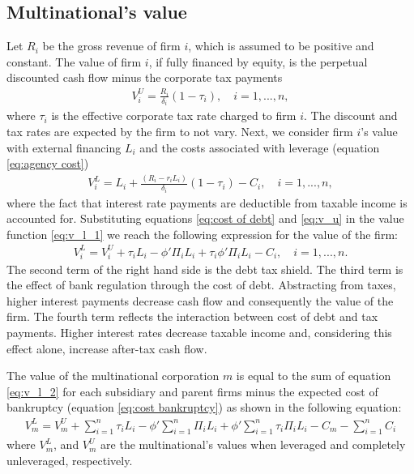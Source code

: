 \documentclass[12pt]{article}
\begin{document}
	\subsection{Multinational's value}
	\label{subsec:value}
	Let $R_i$ be the gross revenue of firm $i$, which is assumed to be positive and constant. The value of firm $i$, if fully financed by equity, is the perpetual discounted cash flow minus the corporate tax payments 
	\begin{equation}
	\begin{aligned}
	V_i^U=\frac{R_i}{\delta_i}(1-\tau_{i}), \quad i=1,...,n,
	\end{aligned}
	\label{eq:v_u}
	\end{equation}	
	where $\tau_{i}$ is the effective corporate tax rate charged to firm $i$. The discount and tax rates are expected by the firm to not vary. Next, we consider firm $i$'s value with external financing $L_i$ and the costs associated with leverage (equation \ref{eq:agency cost})
	\begin{equation}
	\begin{aligned}
	V_i^L=L_i+\frac{(R_i-r_iL_i)}{\delta_i}(1-\tau_{i})-C_i, \quad i=1,...,n,
	\end{aligned}
	\label{eq:v_l_1}
	\end{equation}	
	where the fact that interest rate payments are deductible from taxable income is accounted for. Substituting equations \ref{eq:cost of debt} and \ref{eq:v_u} in the value function \ref{eq:v_l_1} we reach the following expression for the value of the firm:
	\begin{equation}
	\begin{aligned}
	V_i^L=V_i^U+\tau_{i}L_i-\phi'\Pi_iL_i+\tau_{i}\phi'\Pi_iL_i-C_i, \quad i=1,...,n.
	\end{aligned}
	\label{eq:v_l_2}
	\end{equation}	
	The second term of the right hand side is the debt tax shield. The third term is the effect of bank regulation through the cost of debt. Abstracting from taxes, higher interest payments decrease cash flow and consequently the value of the firm. The fourth term reflects the interaction between cost of debt and tax payments. Higher interest rates decrease taxable income and, considering this effect alone, increase after-tax cash flow.
	
	The value of the multinational corporation $m$ is equal to the sum of equation \ref{eq:v_l_2} for each subsidiary and parent firms minus the expected cost of bankruptcy (equation \ref{eq:cost bankruptcy}) as shown in the following equation:
	\begin{equation}
	\begin{aligned}
	V_m^L=V_m^U+\sum_{i=1}^{n}\tau_iL_i-\phi'\sum_{i=1}^{n}\Pi_iL_i+\phi'\sum_{i=1}^{n}\tau_i\Pi_i L_i-C_m-\sum_{i=1}^{n}C_i
	\end{aligned}
	\label{eq:v_l}
	\end{equation}
	where $V_m^L$, and $V_m^U$ are the multinational's values when leveraged and completely unleveraged, respectively.
\end{document}
